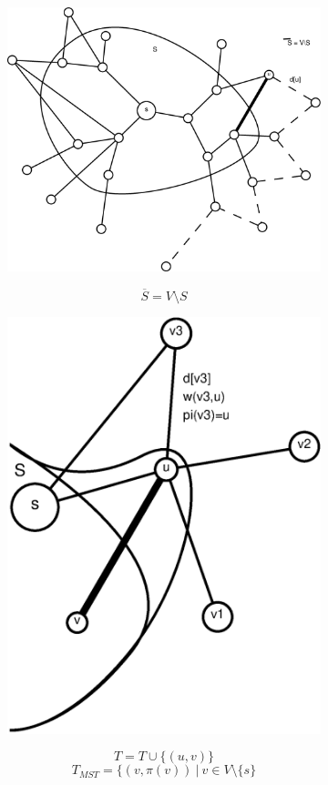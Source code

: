\begin{figure}[h]
\centering
\begin{subfigure}[h]{0.4\textwidth}
	\includegraphics[width=\linewidth]{20/Grafik/img2}
	\caption*{}
	\[ \overline{S} = V \setminus S \]
\end{subfigure}
\begin{subfigure}[h]{0.4\textwidth}
	\includegraphics[width=\linewidth]{20/Grafik/img3}
	\caption*{}
	\[ T=T\cup \{ (u,v) \} \]
	\[ T_{MST}=\{ (v,\pi(v))~|~v\in V\setminus\{ s \} \]
\end{subfigure}
\end{figure}

